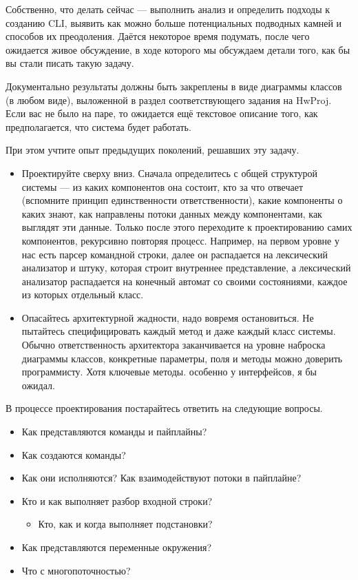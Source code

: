 \documentclass[a5paper]{article}
\begin{document}
Собственно, что делать сейчас --- выполнить анализ и определить подходы к созданию CLI, выявить как можно больше потенциальных подводных камней и способов их преодоления. Даётся некоторое время подумать, после чего ожидается живое обсуждение, в ходе которого мы обсуждаем детали того, как бы вы стали писать такую задачу.

Документально результаты должны быть закреплены в виде диаграммы классов (в любом виде), выложенной в раздел соответствующего задания на HwProj. Если вас не было на паре, то ожидается ещё текстовое описание того, как предполагается, что система будет работать.

При этом учтите опыт предыдущих поколений, решавших эту задачу.
\begin{itemize}
	\item Проектируйте сверху вниз. Сначала определитесь с общей структурой системы --- из каких компонентов она состоит, кто за что отвечает (вспомните принцип единственности ответственности), какие компоненты о каких знают, как направлены потоки данных между компонентами, как выглядят эти данные. Только после этого переходите к проектированию самих компонентов, рекурсивно повторяя процесс. Например, на первом уровне у нас есть парсер командной строки, далее он распадается на лексический анализатор и штуку, которая строит внутреннее представление, а лексический анализатор распадается на конечный автомат со своими состояниями, каждое из которых отдельный класс.
	\item Опасайтесь архитектурной жадности, надо вовремя остановиться. Не пытайтесь специфицировать каждый метод и даже каждый класс системы. Обычно ответственность архитектора заканчивается на уровне наброска диаграммы классов, конкретные параметры, поля и методы можно доверить программисту. Хотя ключевые методы. особенно у интерфейсов, я бы ожидал.
\end{itemize}

В процессе проектирования постарайтесь ответить на следующие вопросы.

\begin{itemize}
	\item Как представляются команды и пайплайны?
	\item Как создаются команды?
	\item Как они исполняются? Как взаимодействуют потоки в пайплайне?
	\item Кто и как выполняет разбор входной строки?
	\begin{itemize}
		\item Кто, как и когда выполняет подстановки?
	\end{itemize}
	\item Как представляются переменные окружения?
	\item Что с многопоточностью?
\end{itemize}
\end{document}
